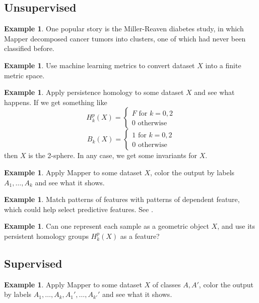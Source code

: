 \documentclass[12pt]{amsart}
\theoremstyle{definition}
\newtheorem{example}[theorem]{Example}
\begin{document}
\subsection{Unsupervised}

\begin{example} One popular story is the Miller-Reaven diabetes study, in which Mapper decomposed cancer tumors into clusters, one of which had never been classified before.
\end{example}

\begin{example} Use machine learning metrics to convert dataset $X$ into a finite metric space.
\end{example}

\begin{example} Apply persistence homology to some dataset $X$ and see what happens. If we get something like
$$H_k^p(X) = \begin{cases} F \text{ for } k = 0, 2 \\ 0 \text{ otherwise} \end{cases}$$
$$B_k(X) = \begin{cases} 1 \text{ for } k = 0, 2 \\ 0 \text{ otherwise} \end{cases}$$
then $X$ is the 2-sphere. In any case, we get some invariants for $X$.
\end{example}

\begin{example} Apply Mapper to some dataset $X$, color the output by labels $A_1, \dots , A_k$ and see what it shows.
\end{example}

\begin{example} Match patterns of features with patterns of dependent feature, which could help select predictive features. See \cite[3.2]{TDAofAyasdi}.
\end{example}

\begin{example} Can one represent each sample as a geometric object $X$, and use its persistent homology groups $H^p_k(X)$ as a feature?
\end{example}

\subsection{Supervised}

\begin{example} Apply Mapper to some dataset $X$ of classes $A, A'$, color the output by labels $A_1, \dots , A_k, A_1', \dots , A_{k'}'$ and see what it shows.
\end{example}
\end{document}
